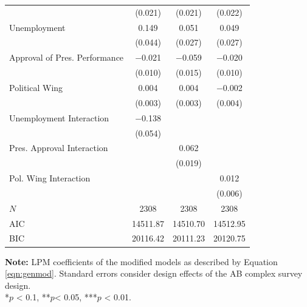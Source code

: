 \documentclass[12pt,a4]{article}\usepackage[]{graphicx}\usepackage[]{xcolor}
\begin{document}
\begin{table}[htbp]
\begin{center}
\begin{tabular}[t]{lccc}
 & (\num{0.021}) & (\num{0.021}) & (\num{0.022})\\
Unemployment & \num{0.149} & \num{0.051} & \num{0.049}\\
 & (\num{0.044}) & (\num{0.027}) & (\num{0.027})\\
Approval of Pres. Performance & \num{-0.021} & \num{-0.059} & \num{-0.020}\\
 & (\num{0.010}) & (\num{0.015}) & (\num{0.010})\\
Political Wing & \num{0.004} & \num{0.004} & \num{-0.002}\\
 & (\num{0.003}) & (\num{0.003}) & (\num{0.004})\\
Unemployment Interaction & \num{-0.138} &  & \\
 & (\num{0.054}) &  & \\
Pres. Approval Interaction &  & \num{0.062} & \\
 &  & (\num{0.019}) & \\
Pol. Wing Interaction &  &  & \num{0.012}\\
 &  &  & (\num{0.006})\\
\midrule
$N$ & \num{2308} & \num{2308} & \num{2308}\\
AIC & \num{14511.87} & \num{14510.70} & \num{14512.95}\\
BIC & \num{20116.42} & \num{20111.23} & \num{20120.75}\\
\bottomrule
\end{tabular}


\end{center}
\textbf{Note:} LPM coefficients of the modified models as described by Equation \ref{eqn:genmod}. Standard errors consider design effects of the AB complex survey design.\\
*$p$ < 0.1, **$p$< 0.05, ***$p$ < 0.01.
\end{table}
\end{document}
